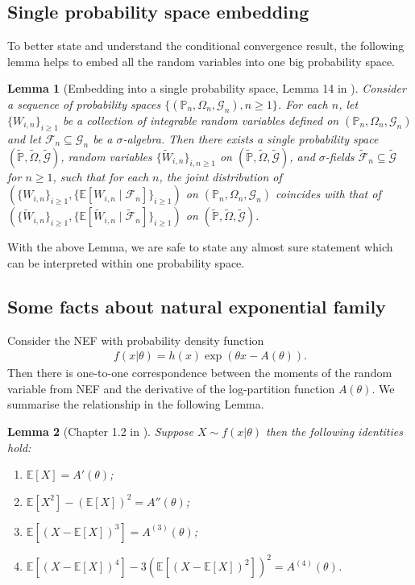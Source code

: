 \documentclass[12pt]{article}
\newtheorem{lemma}{Lemma}
\theoremstyle{definition}
\def\P{\mathbb{P}}
\def\P{\mathbb{P}}
\newcommand{\E}{\mathbb E}								%
\renewcommand{\P}{\mathbb{P}}							%
\begin{document}
\subsection{Single probability space embedding}
To better state and understand the conditional convergence result, the following lemma helps to embed all the random variables into one big probability space.

\begin{lemma}[Embedding into a single probability space, Lemma 14 in \cite{Niu2022a}]\label{lem:embedding}
	Consider a sequence of probability spaces $\{(\P_n,\Omega_n,\mathcal{G}_n),n \geq 1\}$. For each $n$, let $\{W_{i,n}\}_{i \geq 1}$ be a collection of integrable random variables defined on $(\P_n,\Omega_n,\mathcal{G}_n)$ and let $\mathcal F_n \subseteq \mathcal G_n$ be a $\sigma$-algebra. Then there exists a single probability space $(\widetilde{\P}, \widetilde{\Omega}, \widetilde{\mathcal G})$, random variables $\{\widetilde W_{i,n}\}_{i,n \geq 1}$ on $(\widetilde{\P}, \widetilde{\Omega}, \widetilde{\mathcal G})$, and $\sigma$-fields $\widetilde{\mathcal F}_n \subseteq \widetilde{\mathcal G}$ for $n \geq 1$, such that for each $n$, the joint distribution of $(\{W_{i,n}\}_{i \geq 1}, \{\E[W_{i,n}\mid\mathcal F_n]\}_{i \geq 1})$ on $(\P_n,\Omega_n,\mathcal{G}_n)$ coincides with that of $(\{\widetilde W_{i,n}\}_{i \geq 1}, \{\E[\widetilde W_{i,n}\mid \widetilde{\mathcal F}_n]\}_{i \geq 1})$ on $(\widetilde{\P}, \widetilde{\Omega}, \widetilde{\mathcal G})$.
\end{lemma}
\noindent With the above Lemma, we are safe to state any almost sure statement which can be interpreted within one probability space. 

\subsection{Some facts about natural exponential family}

Consider the NEF with probability density function
\begin{align*}
  f(x|\theta)=h(x)\exp(\theta x-A(\theta)).
\end{align*}
Then there is one-to-one correspondence between the moments of the random variable from NEF and the derivative of the log-partition function $A(\theta)$. We summarise the relationship in the following Lemma.

\begin{lemma}[Chapter 1.2 in \cite{Efron2022}]\label{lem:moment_logpartition}
  Suppose $X\sim f(x|\theta)$ then the following identities hold:
  \begin{enumerate}
    \item $\E[X]=A'(\theta)$;
    \item $\E[X^2]-(\E[X])^2=A''(\theta)$;
    \item $\E[(X-\E[X])^3]=A^{(3)}(\theta)$;
    \item $\E[(X-\E[X])^4]-3\left(\E[(X-\E[X])^2]\right)^2=A^{(4)}(\theta)$.
  \end{enumerate}
\end{lemma}
\end{document}

